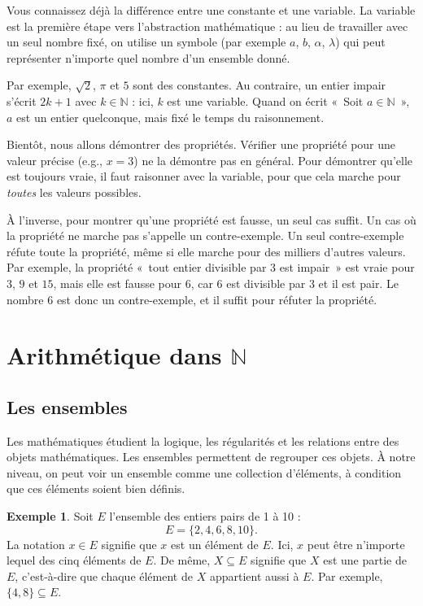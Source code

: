 \documentclass[12pt,a4paper]{article}
\theoremstyle{plain}
\theoremstyle{definition}
\newtheorem{example}[theorem]{Exemple}
\theoremstyle{remark}
\begin{document}
Vous connaissez déjà la différence entre une constante et une variable. La variable
est la première étape vers l'abstraction mathématique : au lieu de travailler avec
un seul nombre fixé, on utilise un symbole (par exemple $a$, $b$, $\alpha$, 
$\lambda$) qui peut représenter n'importe quel nombre d'un ensemble donné.

Par exemple, $\sqrt{2}$, $\pi$ et $5$ sont des constantes. Au contraire, un entier 
impair s'écrit $2k + 1$ avec $k \in \mathbb{N}$ : ici, $k$ est une variable. 
Quand on écrit «~Soit $a \in \mathbb{N}$~», $a$ est un entier quelconque, mais 
fixé le temps du raisonnement.

Bientôt, nous allons démontrer des propriétés. Vérifier une propriété pour une 
valeur précise (e.g., $x = 3$) ne la démontre pas en général. Pour démontrer 
qu'elle est toujours vraie, il faut raisonner avec la variable, pour que cela 
marche pour \textit{toutes} les valeurs possibles.

À l'inverse, pour montrer qu'une propriété est fausse, un seul cas suffit. 
Un cas où la propriété ne marche pas s'appelle un contre-exemple. 
Un seul contre-exemple réfute toute la propriété, même si elle marche pour des 
milliers d'autres valeurs. Par exemple, la propriété «~tout entier divisible par 
$3$ est impair~» est vraie pour $3$, $9$ et $15$, mais elle est fausse pour $6$, 
car $6$ est divisible par $3$ et il est pair. Le nombre $6$ est donc un 
contre-exemple, et il suffit pour réfuter la propriété.

\newpage
\section{Arithmétique dans \texorpdfstring{$\mathbb{N}$}{N}}

\subsection{Les ensembles}

Les mathématiques étudient la logique, les régularités et les relations
entre des objets mathématiques. Les ensembles permettent de regrouper ces
objets. À notre niveau, on peut voir un ensemble comme une collection
d'éléments, à condition que ces éléments soient bien définis.

\begin{example}
  Soit $E$ l'ensemble des entiers pairs de 1 à 10 :
  \[
    E = \{2, 4, 6, 8, 10\}.
  \]
  La notation $x \in E$ signifie que $x$ est un élément de $E$.
  Ici, $x$ peut être n'importe lequel des cinq éléments de $E$.
  De même, $X \subseteq E$ signifie que $X$ est une partie de $E$,
  c'est-à-dire que chaque élément de $X$ appartient aussi à $E$.
  Par exemple, $\{4, 8\} \subseteq E$.
  \label{eg:set}
\end{example}
\end{document}
